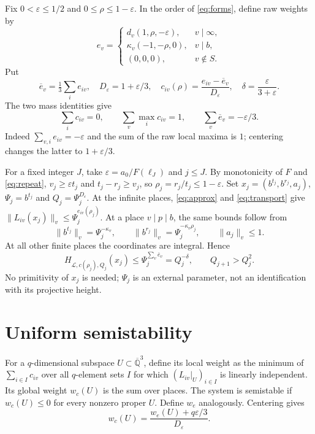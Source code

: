 \documentclass[11pt]{article}
\numberwithin{equation}{section}
\theoremstyle{remark}\newtheorem{remark}[theorem]{Remark}
\newcommand{\Qbar}{\overline{\mathbb Q}}
\newcommand{\eps}{\varepsilon}\newcommand{\LL}{\mathcal L}
\begin{document}
Fix $0<\eps\le1/2$ and $0\le\rho\le1-\eps$. In the order of
\eqref{eq:forms}, define raw weights by
\begin{equation}\label{eq:raw}
 e_v=\begin{cases}
 d_v(1,\rho,-\eps),&v\mid\infty,\\
 \kappa_v(-1,-\rho,0),&v\mid b,\\
 (0,0,0),&v\notin S.
 \end{cases}
\end{equation}
Put
\begin{equation}\label{eq:center}
 \overline e_v=\tfrac13\sum_i e_{iv},\quad D_\eps=1+\eps/3,
 \quad c_{iv}(\rho)=\frac{e_{iv}-\overline e_v}{D_\eps},
 \quad \delta=\frac{\eps}{3+\eps}.
\end{equation}
The two mass identities give
\begin{equation}\label{eq:norm}
 \sum_i c_{iv}=0,\qquad \sum_v\max_i c_{iv}=1,
 \qquad \sum_v\overline e_v=-\eps/3.
\end{equation}
Indeed $\sum_{v,i}e_{iv}=-\eps$ and the sum of the raw local maxima
is $1$; centering changes the latter to $1+\eps/3$.

For a fixed integer $J$, take $\eps=a_0/F(\ell_J)$ and $j\le J$.
By monotonicity of $F$ and \eqref{eq:repeat},
$v_j\ge\eps t_j$ and $t_j-r_j\ge v_j$, so
$\rho_j=r_j/t_j\le1-\eps$.
Set $x_j=(b^{t_j},b^{r_j},a_j)$, $\Psi_j=b^{t_j}$ and
$Q_j=\Psi_j^{D_\eps}$.
At the infinite places, \eqref{eq:approx} and \eqref{eq:transport} give
$\|L_{iv}(x_j)\|_v\le\Psi_j^{e_{iv}(\rho_j)}$.
At a place $v\mid p\mid b$, the same bounds follow from
\[
 \|b^{t_j}\|_v=\Psi_j^{-\kappa_v},\qquad
 \|b^{r_j}\|_v=\Psi_j^{-\kappa_v\rho_j},\qquad
 \|a_j\|_v\le1.
\]
At all other finite places the coordinates are integral. Hence
\begin{equation}\label{eq:small}
 H_{\LL,c(\rho_j),Q_j}(x_j)
 \le\Psi_j^{\sum_v\overline e_v}=Q_j^{-\delta},
 \qquad Q_{j+1}>Q_j^2.
\end{equation}
No primitivity of $x_j$ is needed; $\Psi_j$ is an external parameter,
not an identification with its projective height.

\section{Uniform semistability}\label{sec:stable}
For a $q$-dimensional subspace $U\subset\Qbar^3$, define its local
weight as the minimum of $\sum_{i\in I}c_{iv}$ over all $q$-element
sets $I$ for which $(L_{iv}|_U)_{i\in I}$ is linearly independent.
Its global weight $w_c(U)$ is the sum over places. The system is
semistable if $w_c(U)\le0$ for every nonzero proper $U$.
Define $w_e$ analogously. Centering gives
\begin{equation}\label{eq:weightshift}
 w_c(U)=\frac{w_e(U)+q\eps/3}{D_\eps}.
\end{equation}
\end{document}
